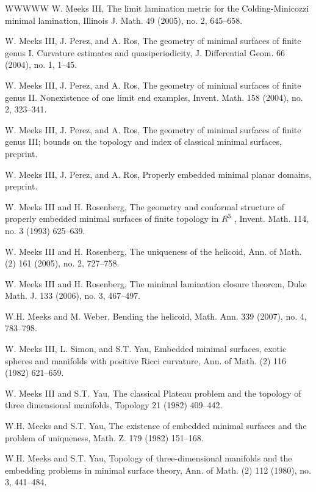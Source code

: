 \begin{thebibliography}{WWWWW}
 W. Meeks III, The limit lamination metric for the Colding-Minicozzi minimal lamination, Illinois J. Math. 49 (2005), no. 2, 645–658.

 W. Meeks III, J. Perez, and A. Ros, The geometry of minimal surfaces of finite genus I. Curvature estimates and quasiperiodicity, J. Differential Geom. 66 (2004), no. 1, 1–45.

 W. Meeks III, J. Perez, and A. Ros, The geometry of minimal surfaces of finite genus II. Nonexistence of one limit end examples, Invent. Math. 158 (2004), no. 2, 323–341.

 W. Meeks III, J. Perez, and A. Ros, The geometry of minimal surfaces of finite genus III; bounds on the topology and index of classical minimal surfaces, preprint.

 W. Meeks III, J. Perez, and A. Ros, Properly embedded minimal planar domains, preprint.

 W. Meeks III and H. Rosenberg, The geometry and conformal structure of properly embedded minimal surfaces of finite topology in $R^{3}$ , Invent. Math. 114, no. 3 (1993) 625–639.

 W. Meeks III and H. Rosenberg, The uniqueness of the helicoid, Ann. of Math. (2) 161 (2005), no. 2, 727–758.

 W. Meeks III and H. Rosenberg, The minimal lamination closure theorem, Duke Math. J. 133 (2006), no. 3, 467–497.

 W.H. Meeks and M. Weber, Bending the helicoid, Math. Ann. 339 (2007), no. 4, 783–798.

 W. Meeks III, L. Simon, and S.T. Yau, Embedded minimal surfaces, exotic spheres and manifolds with positive Ricci curvature, Ann. of Math. (2) 116 (1982) 621–659.

 W. Meeks III and S.T. Yau, The classical Plateau problem and the topology of three dimensional manifolds, Topology 21 (1982) 409–442.

 W.H. Meeks and S.T. Yau, The existence of embedded minimal surfaces and the problem of uniqueness, Math. Z. 179 (1982) 151–168.

 W.H. Meeks and S.T. Yau, Topology of three-dimensional manifolds and the embedding problems in minimal surface theory, Ann. of Math. (2) 112 (1980), no. 3, 441–484.


\end{thebibliography}
